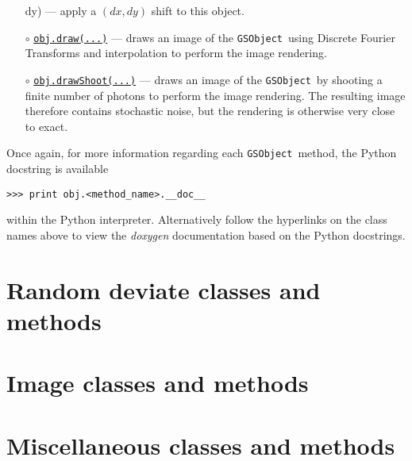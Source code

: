 \documentclass[preprint,11pt]{aastex}
\newcommand{\gsobject}{{\tt GSObject}}
\begin{document}
\begin{itemize}
{{      dy)}} --- apply a $(dx, dy)$ shift to this object.
\item[$\circ$]
  \href{http://galsim-developers.github.com/GalSim/classgalsim_1_1base_1_1_g_s_object.html#ae0b346a8b438dedbc7f60a52220869d8}{\texttt{obj.draw(...)}}
  --- draws an image of the \gsobject~using Discrete Fourier
  Transforms and interpolation to perform the image rendering.
\item[$\circ$]
  \href{http://galsim-developers.github.com/GalSim/classgalsim_1_1base_1_1_g_s_object.html#a42ac334d2840ba3fa832988e998beca0}{\texttt{obj.drawShoot(...)}}
  --- draws an image of the \gsobject~by shooting a finite number of
  photons to perform the image rendering.  The resulting image
  therefore contains stochastic noise, but the rendering is otherwise
  very close to exact.
\end{itemize}
Once again, for more information regarding each \gsobject~method,
the Python docstring is available

{\tt >>> print obj.<method\_name>.\_\_doc\_\_}

within the Python interpreter.  Alternatively follow the hyperlinks on the class names above to view the
\emph{doxygen} documentation based on the Python docstrings.

\section{Random deviate classes and methods}\label{sect:random}


\section{Image classes and methods}\label{sect:image}

\section{Miscellaneous classes and methods}\label{sect:misc}
\end{document}
